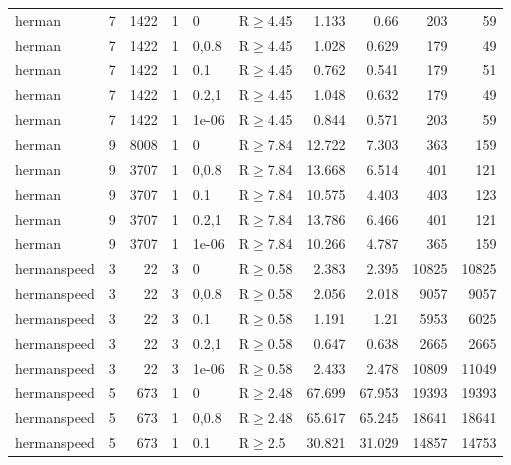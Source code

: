 \begin{longtable}{llrrllrrrr}
 herman        & 7        &   	1422 &   1 & 0     & R$\geq$4.45  & 1.133   & 0.66    & 203     & 59     \\
 herman        & 7        &   	1422 &   1 & 0,0.8 & R$\geq$4.45  & 1.028   & 0.629   & 179     & 49     \\
 herman        & 7        &   	1422 &   1 & 0.1   & R$\geq$4.45  & 0.762   & 0.541   & 179     & 51     \\
 herman        & 7        &   	1422 &   1 & 0.2,1 & R$\geq$4.45  & 1.048   & 0.632   & 179     & 49     \\
 herman        & 7        &   	1422 &   1 & 1e-06 & R$\geq$4.45  & 0.844   & 0.571   & 203     & 59     \\
 herman        & 9        &   	8008 &   1 & 0     & R$\geq$7.84  & 12.722  & 7.303   & 363     & 159    \\
 herman        & 9        &   	3707 &   1 & 0,0.8 & R$\geq$7.84  & 13.668  & 6.514   & 401     & 121    \\
 herman        & 9        &   	3707 &   1 & 0.1   & R$\geq$7.84  & 10.575  & 4.403   & 403     & 123    \\
 herman        & 9        &   	3707 &   1 & 0.2,1 & R$\geq$7.84  & 13.786  & 6.466   & 401     & 121    \\
 herman        & 9        &   	3707 &   1 & 1e-06 & R$\geq$7.84  & 10.266  & 4.787   & 365     & 159    \\
 hermanspeed   & 3        &     	22 &   3 & 0     & R$\geq$0.58  & 2.383   & 2.395   & 10825   & 10825  \\
 hermanspeed   & 3        &     	22 &   3 & 0,0.8 & R$\geq$0.58  & 2.056   & 2.018   & 9057    & 9057   \\
 hermanspeed   & 3        &     	22 &   3 & 0.1   & R$\geq$0.58  & 1.191   & 1.21    & 5953    & 6025   \\
 hermanspeed   & 3        &     	22 &   3 & 0.2,1 & R$\geq$0.58  & 0.647   & 0.638   & 2665    & 2665   \\
 hermanspeed   & 3        &     	22 &   3 & 1e-06 & R$\geq$0.58  & 2.433   & 2.478   & 10809   & 11049  \\
 hermanspeed   & 5        &    	673 &   1 & 0     & R$\geq$2.48  & 67.699  & 67.953  & 19393   & 19393  \\
 hermanspeed   & 5        &    	673 &   1 & 0,0.8 & R$\geq$2.48  & 65.617  & 65.245  & 18641   & 18641  \\
 hermanspeed   & 5        &    	673 &   1 & 0.1   & R$\geq$2.5   & 30.821  & 31.029  & 14857   & 14753  \\

\end{longtable}
